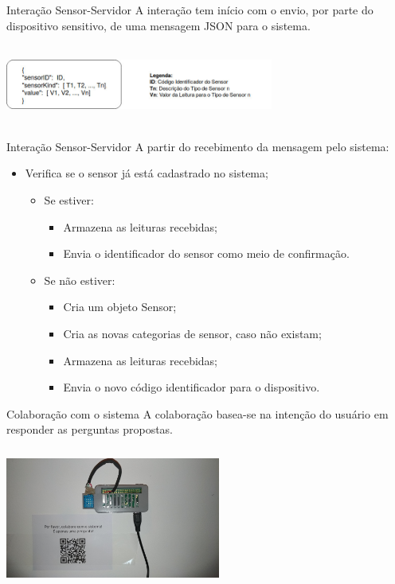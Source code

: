 \documentclass{beamer}
\begin{document}
    \begin{frame}{Interação Sensor-Servidor}
      \quad A interação tem início com o envio, por parte do dispositivo sensitivo, de uma mensagem JSON para o sistema.
      \begin{center}
      \includegraphics[height=75pt, width=250pt]{mensagemJSON}
      \end{center}
    \end{frame}
    \begin{frame}{Interação Sensor-Servidor}
      \quad A partir do recebimento da mensagem pelo sistema:
      \begin{itemize}
        \item Verifica se o sensor já está cadastrado no sistema;
          \begin{itemize}
            \item Se estiver:
            \begin{itemize}
              \item Armazena as leituras recebidas;
              \item Envia o identificador do sensor como meio de confirmação.
            \end{itemize}
            \item Se não estiver:
            \begin{itemize}
              \item Cria um objeto Sensor;
              \item Cria as novas categorias de sensor, caso não existam;
              \item Armazena as leituras recebidas;
              \item Envia o novo código identificador para o dispositivo.
            \end{itemize}
          \end{itemize}
      \end{itemize}
    \end{frame}

    \begin{frame}{Colaboração com o sistema}
      \quad A colaboração basea-se na intenção do usuário em responder as perguntas propostas.
      \begin{center}
      \includegraphics[height=130pt, width=200pt]{sensormsg}
      \end{center}
    \end{frame}
\end{document}
